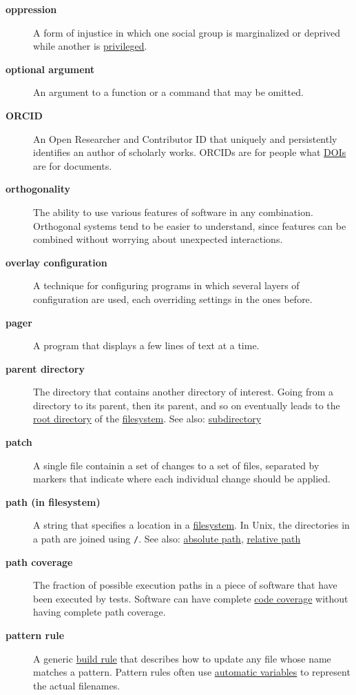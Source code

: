 \documentclass[
]{krantz}
\begin{document}
\begin{description}
\item[\textbf{oppression}]
A form of injustice in which one social group is marginalized or deprived while another is \protect\hyperlink{privilege}{privileged}.
\item[\textbf{optional argument}]
An argument to a function or a command that may be omitted.
\item[\textbf{ORCID}]
An Open Researcher and Contributor ID that uniquely and persistently identifies an author of scholarly works. ORCIDs are for people what \protect\hyperlink{doi}{DOIs} are for documents.
\item[\textbf{orthogonality}]
The ability to use various features of software in any combination. Orthogonal systems tend to be easier to understand, since features can be combined without worrying about unexpected interactions.
\item[\textbf{overlay configuration}]
A technique for configuring programs in which several layers of configuration are used, each overriding settings in the ones before.
\item[\textbf{pager}]
A program that displays a few lines of text at a time.
\item[\textbf{parent directory}]
The directory that contains another directory of interest. Going from a directory to its parent, then its parent, and so on eventually leads to the \protect\hyperlink{root_directory}{root directory} of the \protect\hyperlink{filesystem}{filesystem}. See also: \protect\hyperlink{subdirectory}{subdirectory}
\item[\textbf{patch}]
A single file containin a set of changes to a set of files, separated by markers that indicate where each individual change should be applied.
\item[\textbf{path (in filesystem)}]
A string that specifies a location in a \protect\hyperlink{filesystem}{filesystem}. In Unix, the directories in a path are joined using \texttt{/}. See also: \protect\hyperlink{absolute_path}{absolute path}, \protect\hyperlink{relative_path}{relative path}
\item[\textbf{path coverage}]
The fraction of possible execution paths in a piece of software that have been executed by tests. Software can have complete \protect\hyperlink{code_coverage}{code coverage} without having complete path coverage.
\item[\textbf{pattern rule}]
A generic \protect\hyperlink{build_rule}{build rule} that describes how to update any file whose name matches a pattern. Pattern rules often use \protect\hyperlink{automatic_variable}{automatic variables} to represent the actual filenames.

\end{description}
\end{document}
